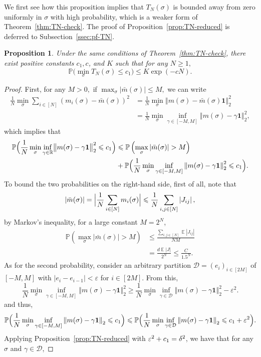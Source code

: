 \documentclass[letterpaper,11pt,reqno]{amsart}
\newtheorem{prop}[thm]{Proposition}
\renewcommand{\le}{\leqslant}
\renewcommand{\ge}{\geqslant}
\renewcommand{\leq}{\leqslant}
\renewcommand{\geq}{\geqslant}
\newcommand{\eps}{\varepsilon}
\newcommand{\norm}[1]{\left\Vert#1\right\Vert}
\newcommand{\abs}[1]{\left\vert#1\right\vert}
\newcommand{\cD}{\mathcal{D}}\newcommand{\cE}{\mathcal{E}}\newcommand{\cF}{\mathcal{F}}
\newcommand{\mv}[1]{\boldsymbol{#1}}\newcommand{\mvinfty}{\boldsymbol{\infty}}\newcommand{\mvzero}{\boldsymbol{0}}
\newcommand{\mvm}{{m}}
\newcommand{\mvgs}{{\sigma}}
\newcommand{\bP}{\mathbb{P}}\newcommand{\bQ}{\mathbb{Q}}\newcommand{\bR}{\mathbb{R}}
\DeclareMathOperator{\E}{\mathds{E}}
\begin{document}
We
first see how this proposition implies that $T_N(\mvgs)$ is bounded away from zero uniformly in $\mvgs$ with high probability, which is a weaker form of Theorem~\ref{thm:TN-check}. The proof of Proposition~\ref{prop:TN-reduced} is deferred to Subsection~\ref{ssec:pf-TN}.

\begin{prop}\label{prop:TN}
   Under the same conditions of Theorem~\ref{thm:TN-check}, there exist positive constants $c_1,c$, and $K$ such that for any $N\geq 1,$
    \[
    \bP\bigl(\min_{\mvgs}T_N(\mvgs) \le c_1\bigr) \le K \exp( - cN).
    \]
\end{prop}


\begin{proof}
First, for any $M>0,$ if $
\max_{\mvgs}|\bar m(\mvgs)|\leq M,$ 
we can write
\begin{align*}
\frac1N\min_{\mvgs}  \sum_{i \in [N]} (m_i(\mvgs) - \bar{m}(\mvgs))^2& = \frac1N\min_{\mvgs}  \norm{\mvm(\mvgs) - \bar{m}(\mvgs) \mv1}_2^2\\
&= \frac{1}{N} \min_{\mvgs} \inf_{\gamma\in [-M,M]}\norm{\mvm(\mvgs) - \gamma \mv1}_2^2,
\end{align*}
which implies that
\begin{align*}
     \bP\Bigl(\frac{1}{N}\min_{\mvgs} \inf_{\gamma\in \bR} \bigl\|\mvm(\mvgs) - \gamma\mv1\bigr\|_2^2 \le c_1\Bigr) 
    &\le  \bP\left(\max_{\mvgs} \abs{\bar{m}(\mvgs)} > M\right) \\
   & + \bP\Bigl( \frac{1}{N} \min_{\mvgs} \inf_{\gamma\in [-M, M]}\norm{\mvm(\mvgs) - \gamma  \mv1}_2^2 \le c_1\Bigr).
\end{align*}
To bound the two probabilities on the right-hand side, first of all, note that
\[
\abs{\bar{m}(\mvgs)} = \Bigl|\frac1N\sum_{i\in[N]} m_i(\mvgs)\Bigr|\le \frac1N \sum_{i,j\in[N]} \abs{J_{ij}},
\]
 by Markov's inequality, for a large constant $M=2^N$,
\begin{align*}
\bP\left(\max_{\mvgs} \abs{\bar{m}(\mvgs)} > M\right) &\le \frac{\sum_{i,j\in[N]} \E \abs{J_{ij}}}{NM} \\
&= \frac{d  \E \abs{J}}{2^N} \le \frac{C}{1.5^N}.
\end{align*}
As for the second probability, consider an arbitrary partition $\mathcal{D}=(e_i)_{i\in [2M]}$ of $[-M,M]$ with $|e_i-e_{i-1}|<\eps$ for $i\in [2M]$.
From this, 
\[
\frac1N \min_{\mvgs} \inf_{\gamma \in[-M,M]} \norm{\mvm(\mvgs) - \gamma  \mv1}_2^2 \ge \frac1N \min_{\mvgs} \inf_{\gamma \in \cD} \norm{\mvm(\mvgs) - \gamma  \mv1}_2^2 - \eps^2.
\]
and thus,
\[
\bP\Bigl(\frac1N \min_{\mvgs  } \inf_{\gamma\in [-M,M]} \norm{\mvm(\mvgs) - \gamma  \mv1}_2\le c_1 \Bigr) \le \bP\Bigl(\frac1N \min_{\mvgs } \inf_{\gamma\in \cD} \norm{\mvm(\mvgs) - \gamma  \mv1}_2\le c_1 + \eps^2 \Bigr).
\]
Applying Proposition~\ref{prop:TN-reduced} with $\eps^2+c_1= \gd^2$, we have that for any $\mvgs$ and $\gamma \in \cD$,


\end{proof}
\end{document}
